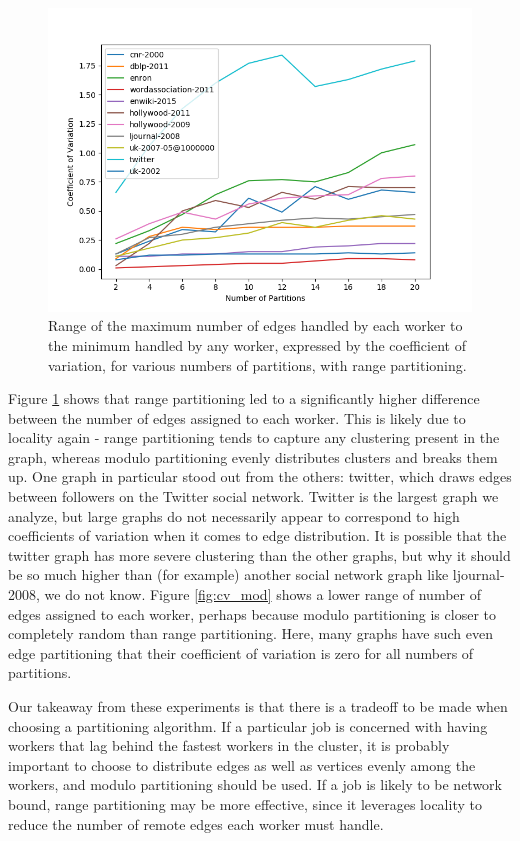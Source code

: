 \begin{figure}[!t]
	\centering
	\includegraphics[width=\columnwidth]{../good_plots/range_as_cv_chunked.png}
	\caption{Range of the maximum number of edges handled by each worker to the 
		minimum handled by any worker, expressed by the coefficient of 
		variation, for various numbers of partitions, with range 
		partitioning.}
	\label{fig:cv_range}
\end{figure}

Figure \ref{fig:cv_range} shows that range partitioning led to a significantly 
higher 
difference between the number of edges assigned to each worker. This is likely 
due to locality again - range partitioning tends to capture any clustering 
present in the graph, whereas modulo partitioning evenly distributes clusters 
and breaks them up. One graph in particular stood out from the others: twitter, 
which draws edges between followers on the Twitter social network. Twitter is 
the largest graph we analyze, but large graphs do not necessarily appear to 
correspond to high coefficients of variation when it comes to edge 
distribution. It is possible that the twitter graph has more severe clustering 
than the other graphs, but why it should be so much higher than (for example) 
another social network graph like ljournal-2008, we do not know. Figure 
\ref{fig:cv_mod} shows a lower range of number of edges assigned to each 
worker, perhaps because modulo partitioning is closer to completely random than 
range partitioning. Here, many graphs have such even edge partitioning that 
their coefficient of variation is zero for all numbers of partitions. 

Our takeaway from these experiments is that there is a tradeoff to be made when 
choosing a partitioning algorithm. If a particular job is concerned with having 
workers that lag behind the fastest workers in the cluster, it is probably 
important to choose to distribute edges as well as vertices evenly among the 
workers, and modulo partitioning should be used. If a job is likely to be 
network bound, range partitioning may be more effective, since it leverages 
locality to reduce the number of remote edges each worker must handle.